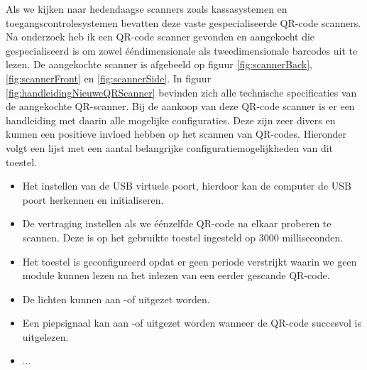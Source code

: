 Als we kijken naar hedendaagse scanners zoals kassasystemen en toegangscontrolesystemen bevatten deze vaste gespecialiseerde QR-code scanners. Na onderzoek heb ik een QR-code scanner gevonden en aangekocht die gespecialiseerd is om zowel ééndimensionale als tweedimensionale barcodes uit te lezen. De aangekochte scanner is afgebeeld op figuur \ref{fig:scannerBack}, \ref{fig:scannerFront} en \ref{fig:scannerSide}. In figuur \ref{fig:handleidingNieuweQRScanner} bevinden zich alle technische specificaties van de aangekochte QR-scanner. Bij de aankoop van deze QR-code scanner is er een handleiding met daarin alle mogelijke configuraties. Deze zijn zeer divers en kunnen een positieve invloed hebben op het scannen van QR-codes. Hieronder volgt een lijst met een aantal belangrijke configuratiemogelijkheden van dit toestel.

\begin{itemize}
    \item Het instellen van de USB virtuele poort, hierdoor kan de computer de USB poort herkennen en initialiseren. 
    \item De vertraging instellen als we éénzelfde QR-code na elkaar proberen te scannen. Deze is op het gebruikte toestel ingesteld op 3000 milliseconden.
    \item Het toestel is geconfigureerd opdat er geen periode verstrijkt waarin we geen module kunnen lezen na het inlezen van een eerder gescande QR-code.
    \item De lichten kunnen aan -of uitgezet worden.
    \item Een piepsignaal kan aan -of uitgezet worden wanneer de QR-code succesvol is uitgelezen.
    \item ...
\end{itemize}



